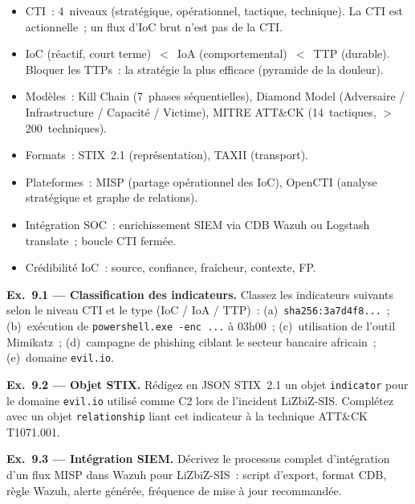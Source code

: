 \begin{boxresume}
\begin{itemize}
  \item CTI~: 4~niveaux (stratégique, opérationnel, tactique, technique).
        La CTI est actionnelle~; un flux d'IoC brut n'est pas de la CTI.
  \item IoC (réactif, court terme)~$<$~IoA (comportemental)~$<$~TTP
        (durable). Bloquer les TTPs~: la stratégie la plus efficace
        (pyramide de la douleur).
  \item Modèles~: Kill Chain (7~phases séquentielles), Diamond Model
        (Adversaire / Infrastructure / Capacité / Victime), MITRE ATT\&CK
        (14~tactiques, $>$200~techniques).
  \item Formats~: STIX~2.1 (représentation), TAXII (transport).
  \item Plateformes~: MISP (partage opérationnel des IoC),
        OpenCTI (analyse stratégique et graphe de relations).
  \item Intégration SOC~: enrichissement SIEM via CDB Wazuh ou Logstash
        translate~; boucle CTI fermée.
  \item Crédibilité IoC~: source, confiance, fraîcheur, contexte, FP.
\end{itemize}
\end{boxresume}

\begin{boxexo}
\textbf{Ex.~9.1 — Classification des indicateurs.}
Classez les indicateurs suivants selon le niveau CTI et le type
(IoC / IoA / TTP)~: (a)~\texttt{sha256:3a7d4f8...}~;
(b)~exécution de \texttt{powershell.exe -enc ...} à 03h00~;
(c)~utilisation de l'outil Mimikatz~; (d)~campagne de phishing
ciblant le secteur bancaire africain~; (e)~domaine \texttt{evil.io}.

\medskip\textbf{Ex.~9.2 — Objet STIX.}
Rédigez en JSON STIX~2.1 un objet \texttt{indicator} pour le domaine
\texttt{evil.io} utilisé comme C2 lors de l'incident LiZbiZ-SIS.
Complétez avec un objet \texttt{relationship} liant cet indicateur
à la technique ATT\&CK T1071.001.

\medskip\textbf{Ex.~9.3 — Intégration SIEM.}
Décrivez le processus complet d'intégration d'un flux MISP dans
Wazuh pour LiZbiZ-SIS~: script d'export, format CDB, règle Wazuh,
alerte générée, fréquence de mise à jour recommandée.
\end{boxexo}
